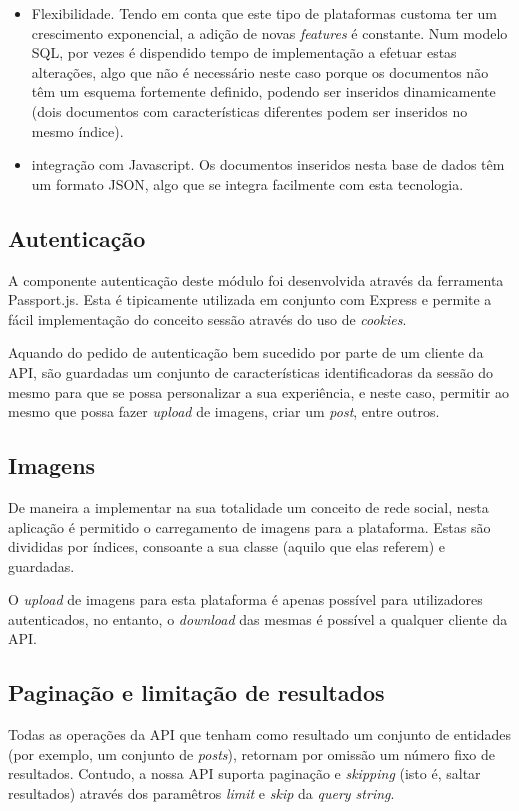 \begin{itemize}
	\item Flexibilidade. Tendo em conta que este tipo de plataformas customa ter um crescimento exponencial, a adição de novas \textit{features} é constante. Num modelo SQL, por vezes é dispendido tempo de implementação a efetuar estas alterações, algo que não é necessário neste caso porque os documentos não têm um esquema fortemente definido, podendo ser inseridos dinamicamente (dois documentos com características diferentes podem ser inseridos no mesmo índice).
	\item integração com Javascript. Os documentos inseridos nesta base de dados têm um formato JSON, algo que se integra facilmente com esta tecnologia.
\end{itemize} 

\subsection{Autenticação}
A componente autenticação deste módulo foi desenvolvida através da ferramenta Passport.js. Esta é tipicamente utilizada em conjunto com Express e permite a fácil implementação do conceito sessão através do uso de \textit{cookies}. \par \medskip

Aquando do pedido de autenticação bem sucedido por parte de um cliente da API, são guardadas um conjunto de características identificadoras da sessão do mesmo para que se possa personalizar a sua experiência, e neste caso, permitir ao mesmo que possa fazer \textit{upload} de imagens, criar um \textit{post}, entre outros. \par \medskip

\subsection{Imagens}
De maneira a implementar na sua totalidade um conceito de rede social, nesta aplicação é permitido o carregamento de imagens para a plataforma. Estas são divididas por índices, consoante a sua classe (aquilo que elas referem) e guardadas. \par \medskip

O \textit{upload} de imagens para esta plataforma é apenas possível para utilizadores autenticados, no entanto, o \textit{download} das mesmas é possível a qualquer cliente da API.

\subsection{Paginação e limitação de resultados}
Todas as operações da API que tenham como resultado um conjunto de entidades (por exemplo, um conjunto de \textit{posts}), retornam por omissão um número fixo de resultados. Contudo, a nossa API suporta paginação e \textit{skipping} (isto é, saltar resultados) através dos paramêtros \textit{limit} e \textit{skip} da \textit{query string}.

